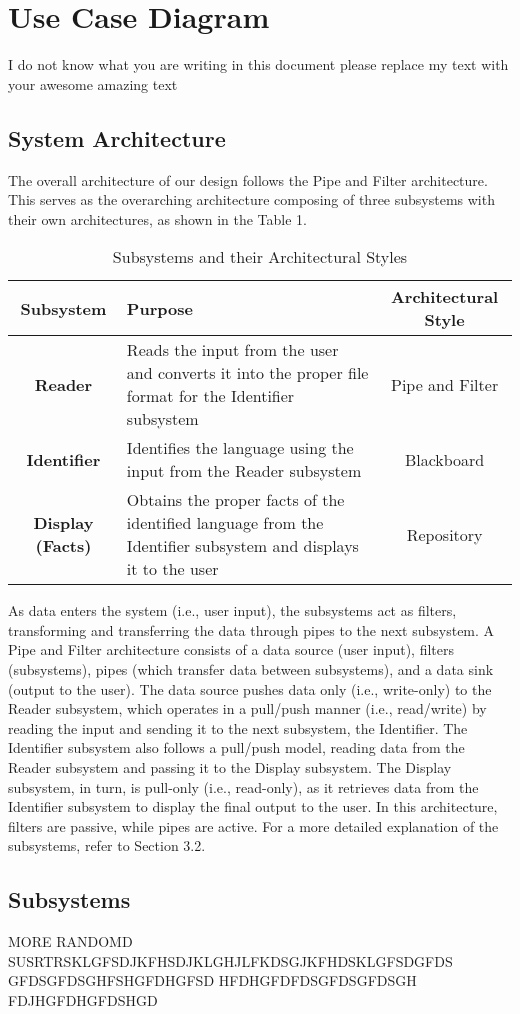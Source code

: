 \section{Use Case Diagram}
\label{sec:use_case_diagram}
I do not know what you are writing in this document please replace my text with your awesome amazing text

\subsection{System Architecture}
\label{sub:system_architecture}
The overall architecture of our design follows the Pipe and Filter architecture. This serves as the overarching architecture composing of three subsystems with their own architectures, as shown in the Table 1.

\begin{table}[h]
    \centering
    \renewcommand{\arraystretch}{1.5}
    \begin{tabular}{|c|p{8cm}|c|}
        \hline
        \textbf{Subsystem} & \textbf{Purpose} & \textbf{Architectural Style} \\
        \hline
        \textbf{Reader} & Reads the input from the user and converts it into the proper file format for the Identifier subsystem & Pipe and Filter \\
        \hline
        \textbf{Identifier} & Identifies the language using the input from the Reader subsystem & Blackboard \\
        \hline
        \textbf{Display (Facts)} & Obtains the proper facts of the identified language from the Identifier subsystem and displays it to the user & Repository \\
        \hline
    \end{tabular}
    \caption{Subsystems and their Architectural Styles}
    \label{tab:subsystems}
\end{table}

\noindent
As data enters the system (i.e., user input), the subsystems act as filters, transforming and transferring the data through pipes to the next subsystem. A Pipe and Filter architecture consists of a data source (user input), filters (subsystems), pipes (which transfer data between subsystems), and a data sink (output to the user). The data source pushes data only (i.e., write-only) to the Reader subsystem, which operates in a pull/push manner (i.e., read/write) by reading the input and sending it to the next subsystem, the Identifier. The Identifier subsystem also follows a pull/push model, reading data from the Reader subsystem and passing it to the Display subsystem. The Display subsystem, in turn, is pull-only (i.e., read-only), as it retrieves data from the Identifier subsystem to display the final output to the user. In this architecture, filters are passive, while pipes are active. For a more detailed explanation of the subsystems, refer to Section 3.2. \\

\subsection{Subsystems}
\label{sub:subsystems}
MORE RANDOMD SUSRTRSKLGFSDJKFHSDJKLGHJLFKDSGJKFHDSKLGFSDGFDS
GFDSGFDSGHFSHGFDHGFSD
HFDHGFDFDSGFDSGFDSGH
FDJHGFDHGFDSHGD

